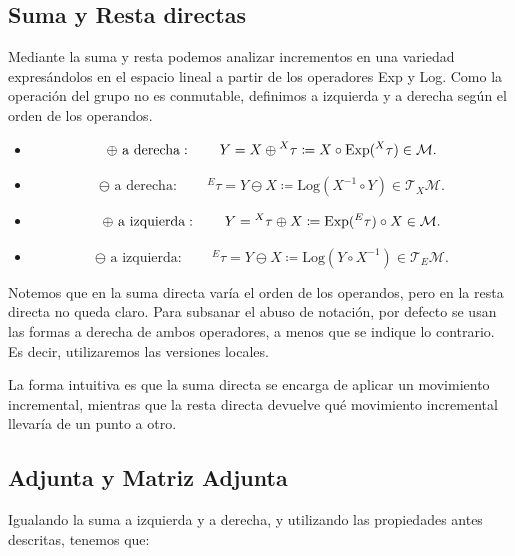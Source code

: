 \subsection{Suma y Resta directas}

Mediante la suma y resta podemos analizar incrementos en una variedad expresándolos en el espacio lineal a partir de los operadores Exp y Log. Como la operación del grupo no es conmutable, definimos a izquierda y a derecha según el orden de los operandos.

\begin{itemize}
\item 
$$
\oplus \text{ a derecha}: \qquad Y = X \oplus \\^X\tau \coloneq
                    X \circ \text{Exp}(^X\tau) \in \mathcal{M}.
$$

\item
$$
\ominus \text{ a derecha}: \qquad ^E\tau = Y \ominus X \coloneq
             \text{Log}(X^{-1} \circ Y) \in \mathcal{T}_X\mathcal{M}.
$$

\item 
$$
\oplus \text{ a izquierda}: \qquad Y = \\^X\tau \oplus X \coloneq
                    \text{Exp}(^E\tau) \circ X \in \mathcal{M}.
$$

\item 
$$
\ominus \text{ a izquierda}: \qquad ^E\tau = Y \ominus X \coloneq
             \text{Log}(Y \circ X^{-1}) \in \mathcal{T}_E\mathcal{M}.
$$

\end{itemize}

Notemos que en la suma directa varía el orden de los operandos, pero en la resta directa no queda claro. Para subsanar el abuso de notación, por defecto se usan las formas a derecha de ambos operadores, a menos que se indique lo contrario. Es decir, utilizaremos las versiones locales.

La forma intuitiva es que la suma directa se encarga de aplicar un movimiento incremental, mientras que la resta directa devuelve qué movimiento incremental llevaría de un punto a otro.

\subsection{Adjunta y Matriz Adjunta}

Igualando la suma a izquierda y a derecha, y utilizando las propiedades antes descritas, tenemos que:
    
